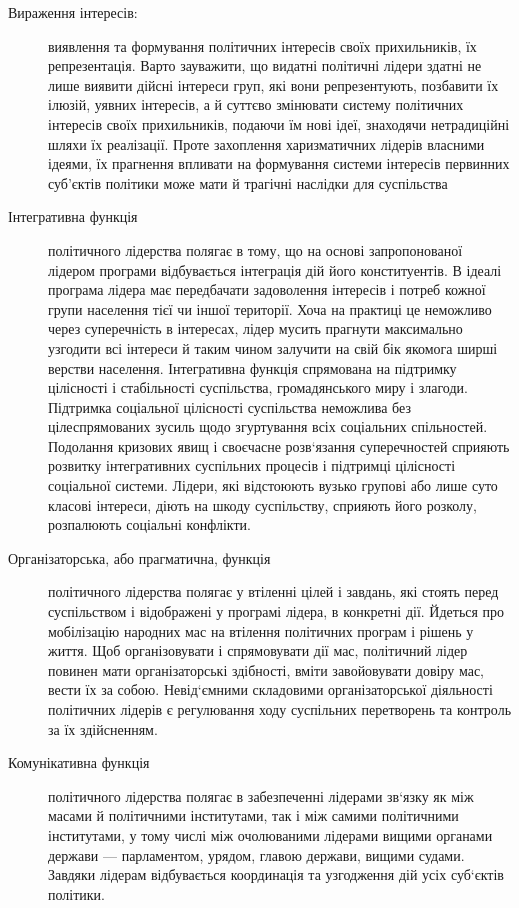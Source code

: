 \begin{description}
\item[Вираження інтересів:] виявлення та формування політичних інтересів своїх прихильників, їх репрезентація. Варто зауважити, що видатні політичні лідери здатні не лише виявити дійсні інтереси груп, які вони репрезентують, позбавити їх ілюзій, уявних інтересів, а й суттєво змінювати систему політичних інтересів своїх прихильників, подаючи їм нові ідеї, знаходячи нетрадиційні шляхи їх реалізації. Проте захоплення харизматичних лідерів власними ідеями, їх прагнення впливати на формування системи інтересів первинних суб'єктів політики може мати й трагічні наслідки для суспільства
\item[Інтегративна функція] політичного лідерства полягає в тому, що на основі запропонованої лідером програми відбувається інтеграція дій його конституентів. В ідеалі програма лідера має передбачати задоволення інтересів і потреб кожної групи населення тієї чи іншої території. Хоча на практиці це неможливо через суперечність в інтересах, лідер мусить прагнути максимально узгодити всі інтереси й таким чином залучити на свій бік якомога ширші верстви населення. Інтегративна функція спрямована на підтримку цілісності і стабільності суспільства, громадянського миру і злагоди. Підтримка соціальної цілісності суспільства неможлива без цілеспрямованих зусиль щодо згуртування всіх соціальних спільностей. Подолання кризових явищ і своєчасне розв`язання суперечностей сприяють розвитку інтегративних суспільних процесів і підтримці цілісності соціальної системи. Лідери, які відстоюють вузько групові або лише суто класові інтереси, діють на шкоду суспільству, сприяють його розколу, розпалюють соціальні конфлікти.
\item[Організаторська, або прагматична, функція] політичного лідерства полягає у втіленні цілей і завдань, які стоять перед суспільством і відображені у програмі лідера, в конкретні дії. Йдеться про мобілізацію народних мас на втілення політичних програм і рішень у життя. Щоб організовувати і спрямовувати дії мас, політичний лідер повинен мати організаторські здібності, вміти завойовувати довіру мас, вести їх за собою. Невід`ємними складовими організаторської діяльності політичних лідерів є регулювання ходу суспільних перетворень та контроль за їх здійсненням.
\item[Комунікативна функція] політичного лідерства полягає в забезпеченні лідерами зв`язку як між масами й політичними інститутами, так і між самими політичними інститутами, у тому числі між очолюваними лідерами вищими органами держави — парламентом, урядом, главою держави, вищими судами. Завдяки лідерам відбувається координація та узгодження дій усіх суб`єктів політики.
\end{description}
